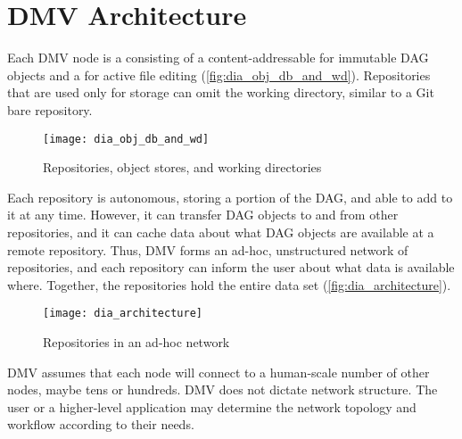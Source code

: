 \chapter{DMV Architecture}

Each \gls{DMV} node is a  consisting of a
content-addressable  for immutable DAG objects and a
 for active file editing
(\autoref{fig:dia_obj_db_and_wd}). Repositories that are used only for storage
can omit the working directory, similar to a Git bare repository.

\begin{figure}[h]
  \centering
    \texttt{[image: dia\_obj\_db\_and\_wd]}
  \caption{Repositories, object stores, and working directories}
  \label{fig:dia_obj_db_and_wd}
\end{figure}

Each repository is autonomous, storing a portion of the DAG, and able to add to
it at any time. However, it can transfer DAG objects to and from other
repositories, and it can cache data about what DAG objects are available at a
remote repository. Thus, \gls{DMV} forms an ad-hoc, unstructured network of
repositories, and each repository can inform the user about what data is
available where. Together, the repositories hold the entire data set
(\autoref{fig:dia_architecture}).

\begin{figure}[h]
  \centering
    \texttt{[image: dia\_architecture]}
  \caption{Repositories in an ad-hoc network}
  \label{fig:dia_architecture}
\end{figure}

\gls{DMV} assumes that each node will connect to a human-scale number of other
nodes, maybe tens or hundreds. \gls{DMV} does not dictate network structure. The
user or a higher-level application may determine the network topology and
workflow according to their needs.
